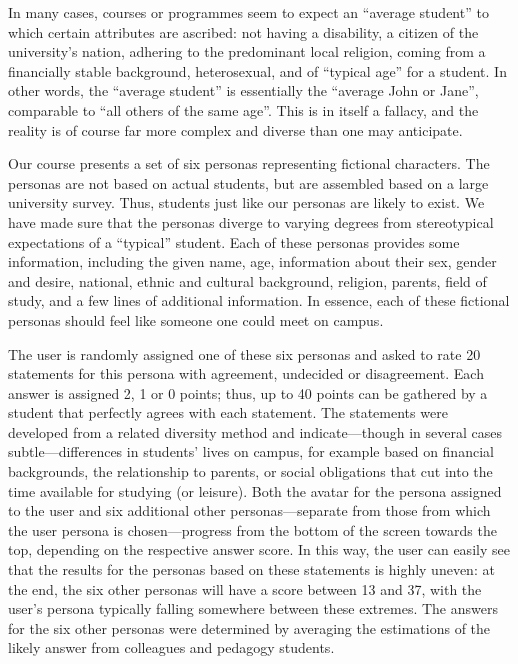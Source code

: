 \documentclass[sigconf,screen]{acmart}
\begin{document}
In many cases, courses or programmes seem to expect an ``average student'' to which
certain attributes are ascribed: not having  a disability, a citizen of the university's nation,
adhering to the predominant local religion, coming from a financially stable background,
heterosexual, and of ``typical age'' for a student. In other words, the ``average student''
is essentially the ``average John or Jane'', comparable to ``all others of the same age''.
This is in itself a fallacy, and the reality is of course far more complex and diverse than
one may anticipate.

Our course presents a set of six personas representing fictional characters. The
personas are not based on actual students, but are assembled based on a large
university survey. Thus, students just like our personas are likely to exist.
We have made sure that the personas diverge to varying degrees from stereotypical expectations
of a ``typical'' student. Each of these personas provides some information, including the
given name, age, information about their sex, gender and desire, national, ethnic and
cultural background, religion, parents, field of study, and a few lines of additional
information. In essence, each of these fictional personas
should feel like someone one could meet on campus.

The user is randomly assigned one of these six personas and asked to rate 20
statements for this persona with agreement, undecided or disagreement. Each answer
is assigned 2, 1 or 0 points; thus, up to 40 points can be gathered by a student
that perfectly agrees with each statement. The statements were developed from a
related diversity method and indicate---though in several cases subtle---differences
in students' lives on campus, for example based on financial backgrounds, the relationship
to parents, or social obligations that cut into the time available for studying
(or leisure). Both the avatar for the persona assigned to the user  and six additional
other personas---separate from those from which the user persona is chosen---progress
from the bottom of the screen towards the top, depending on the respective answer
score. In this way, the user can easily see that the results for the personas based
on these statements is highly uneven: at the end, the six other personas will have a
score between 13 and 37, with the user's persona typically falling
somewhere between these extremes. The answers for the six other personas were determined by
averaging the estimations of the likely answer from colleagues and pedagogy students. 
\end{document}
